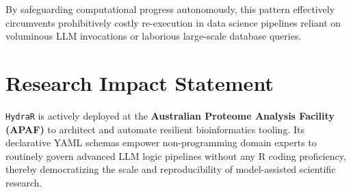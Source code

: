 \documentclass[
]{article}
\newenvironment{Shaded}{}{}
\newcommand{\AttributeTok}[1]{\textcolor[rgb]{0.49,0.56,0.16}{#1}}
\newcommand{\CommentTok}[1]{\textcolor[rgb]{0.38,0.63,0.69}{\textit{#1}}}
\newcommand{\ConstantTok}[1]{\textcolor[rgb]{0.53,0.00,0.00}{#1}}
\newcommand{\FunctionTok}[1]{\textcolor[rgb]{0.02,0.16,0.49}{#1}}
\newcommand{\NormalTok}[1]{#1}
\newcommand{\OtherTok}[1]{\textcolor[rgb]{0.00,0.44,0.13}{#1}}
\newcommand{\SpecialCharTok}[1]{\textcolor[rgb]{0.25,0.44,0.63}{#1}}
\newcommand{\StringTok}[1]{\textcolor[rgb]{0.25,0.44,0.63}{#1}}
\begin{document}
\begin{Shaded}
\end{Shaded}

By safeguarding computational progress autonomously, this pattern
effectively circumvents prohibitively costly re-execution in data
science pipelines reliant on voluminous LLM invocations or laborious
large-scale database queries.

\section{Research Impact Statement}\label{research-impact-statement}

\texttt{HydraR} is actively deployed at the \textbf{Australian Proteome
Analysis Facility (APAF)} to architect and automate resilient
bioinformatics tooling. Its declarative YAML schemas empower
non-programming domain experts to routinely govern advanced LLM logic
pipelines without any R coding proficiency, thereby democratizing the
scale and reproducibility of model-assisted scientific research.
\end{document}
